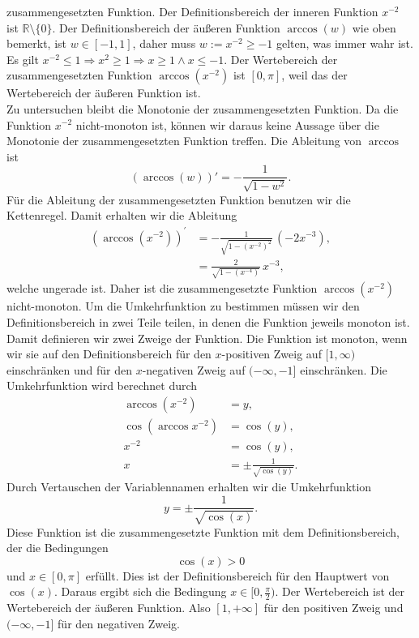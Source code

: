 {\begin{iii}
zusammengesetzten Funktion. Der Definitionsbereich der inneren Funktion $x^{-2}$ ist $\mathbb R \setminus \{0\}$. Der Definitionsbereich der 
\"au\ss eren Funktion $\arccos(w)$ wie oben bemerkt, ist $w\in[-1,1]$, daher muss $w:=x^{-2}\geq-1$ gelten, was immer wahr ist. Es gilt
$x^{-2} \leq 1 \Rightarrow x^2 \ge 1 \Rightarrow x \ge 1 \land x \leq -1$. Der Wertebereich der zusammengesetzten Funktion $\arccos(x^{-2})$ ist $[0,\pi]$, weil das 
der Wertebereich der \"au\ss eren Funktion ist.\\
Zu untersuchen bleibt die Monotonie der zusammengesetzten Funktion. Da die Funktion $x^{-2}$ nicht-monoton ist, k\"onnen wir daraus keine Aussage \"uber 
die Monotonie der zusammengesetzten Funktion treffen. Die Ableitung von $\arccos$ ist
$$(\arccos(w))' = -\frac{1}{\sqrt{1-w^2}}.$$
F\"ur die Ableitung der zusammengesetzten Funktion benutzen wir die Kettenregel. Damit erhalten wir die Ableitung
\begin{align*}
\left(\arccos(x^{-2})\right)^\prime & = -\frac{1}{\sqrt{1-(x^{-2})^2}}\, (-2 x^{-3}),\\
& = \frac{2}{\sqrt{1-(x^{-4})}}\, x^{-3},
\end{align*}
welche ungerade ist. Daher ist die zusammengesetzte Funktion $\arccos(x^{-2})$ nicht-monoton. Um die Umkehrfunktion zu bestimmen m\"ussen wir den Definitionsbereich
in zwei Teile teilen, in denen die Funktion jeweils monoton ist. Damit definieren wir zwei Zweige der Funktion. Die Funktion ist monoton, wenn wir sie auf den Definitionsbereich 
f\"ur den $x$-positiven Zweig auf $[1, \infty)$ einschr\"anken und f\"ur den $x$-negativen Zweig auf $(-\infty, -1]$ einschr\"anken. 
Die Umkehrfunktion wird berechnet durch
\begin{align*}
\arccos(x^{-2}) &= y,\\
\cos(\arccos{x^{-2}}) & = \cos(y),\\
x^{-2} & = \cos(y),\\
x & = \pm \frac{1}{\sqrt{\cos(y)}}.
\end{align*}
Durch Vertauschen der Variablennamen erhalten wir die Umkehrfunktion
$$
y = \pm \frac{1}{\sqrt{\cos(x)}}.
$$
Diese Funktion ist die zusammengesetzte Funktion mit dem Definitionsbereich, der die Bedingungen $$\cos(x)>0$$ und $x\in [0, \pi]$ erf\"ullt. 
Dies ist der Definitionsbereich f\"ur den Hauptwert von $\cos(x)$. Daraus ergibt sich die Bedingung $x\in [0,\frac{\pi}{2})$.  Der Wertebereich ist der Wertebereich der \"au\ss eren Funktion.
Also $[1, +\infty]$ f\"ur den positiven Zweig und  $(-\infty, -1]$ f\"ur den negativen Zweig.
\end{iii}
}

